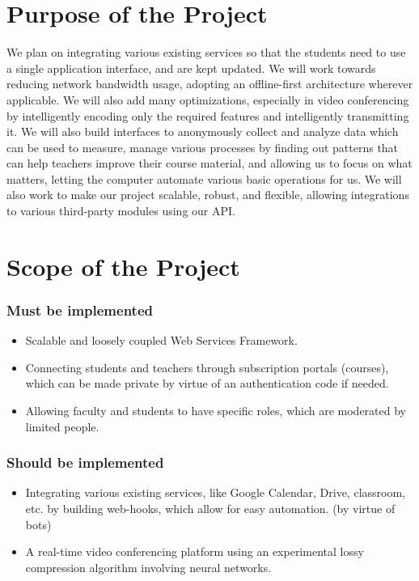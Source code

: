 \section{Purpose of the Project}

We plan on integrating various existing services so that the students need to use a single application interface, 
and are kept updated. We will work towards reducing network bandwidth usage, adopting an offline-first architecture 
wherever applicable. 
We will also add many optimizations, especially in video conferencing by intelligently encoding only the 
required features and intelligently transmitting it. We will also build interfaces to anonymously collect and 
analyze data which can be used to measure, manage various processes by finding out patterns that can help teachers 
improve their course material, and allowing us to focus on what matters, letting the computer automate various 
basic operations for us. We will also work to make our project scalable, robust, and flexible, allowing integrations 
to various third-party modules using our API.

\section{Scope of the Project}
\subsubsection{Must be implemented}
\begin{itemize}
    \item Scalable and loosely coupled Web Services Framework.
    \item Connecting students and teachers through subscription portals (courses), 
    which can be made private by virtue of an authentication code if needed.
    \item Allowing faculty and students to have specific roles, which are moderated by limited people.
\end{itemize}

\subsubsection{Should be implemented}
\begin{itemize}
    \item Integrating various existing services, like Google Calendar, Drive, classroom, etc. 
    by building web-hooks, which allow for easy automation. (by virtue of bots)
    \item A real-time video conferencing platform using an experimental lossy compression algorithm involving neural networks.
\end{itemize}

